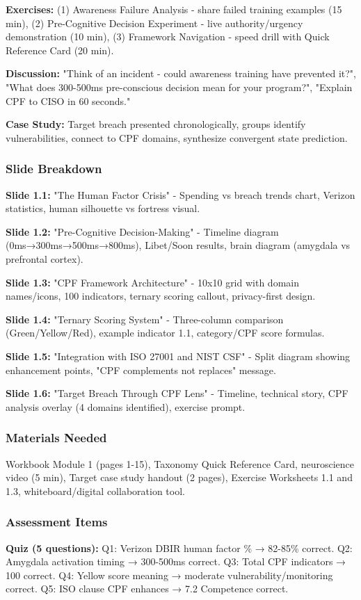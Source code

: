 \documentclass[11pt,a4paper]{article}
\begin{document}
\textbf{Exercises:} (1) Awareness Failure Analysis - share failed training examples (15 min), (2) Pre-Cognitive Decision Experiment - live authority/urgency demonstration (10 min), (3) Framework Navigation - speed drill with Quick Reference Card (20 min).

\textbf{Discussion:} "Think of an incident - could awareness training have prevented it?", "What does 300-500ms pre-conscious decision mean for your program?", "Explain CPF to CISO in 60 seconds."

\textbf{Case Study:} Target breach presented chronologically, groups identify vulnerabilities, connect to CPF domains, synthesize convergent state prediction.

\subsubsection{Slide Breakdown}
\textbf{Slide 1.1:} "The Human Factor Crisis" - Spending vs breach trends chart, Verizon statistics, human silhouette vs fortress visual.

\textbf{Slide 1.2:} "Pre-Cognitive Decision-Making" - Timeline diagram (0ms→300ms→500ms→800ms), Libet/Soon results, brain diagram (amygdala vs prefrontal cortex).

\textbf{Slide 1.3:} "CPF Framework Architecture" - 10x10 grid with domain names/icons, 100 indicators, ternary scoring callout, privacy-first design.

\textbf{Slide 1.4:} "Ternary Scoring System" - Three-column comparison (Green/Yellow/Red), example indicator 1.1, category/CPF score formulas.

\textbf{Slide 1.5:} "Integration with ISO 27001 and NIST CSF" - Split diagram showing enhancement points, "CPF complements not replaces" message.

\textbf{Slide 1.6:} "Target Breach Through CPF Lens" - Timeline, technical story, CPF analysis overlay (4 domains identified), exercise prompt.

\subsubsection{Materials Needed}
Workbook Module 1 (pages 1-15), Taxonomy Quick Reference Card, neuroscience video (5 min), Target case study handout (2 pages), Exercise Worksheets 1.1 and 1.3, whiteboard/digital collaboration tool.

\subsubsection{Assessment Items}
\textbf{Quiz (5 questions):} Q1: Verizon DBIR human factor \% → 82-85\% correct. Q2: Amygdala activation timing → 300-500ms correct. Q3: Total CPF indicators → 100 correct. Q4: Yellow score meaning → moderate vulnerability/monitoring correct. Q5: ISO clause CPF enhances → 7.2 Competence correct.
\end{document}
